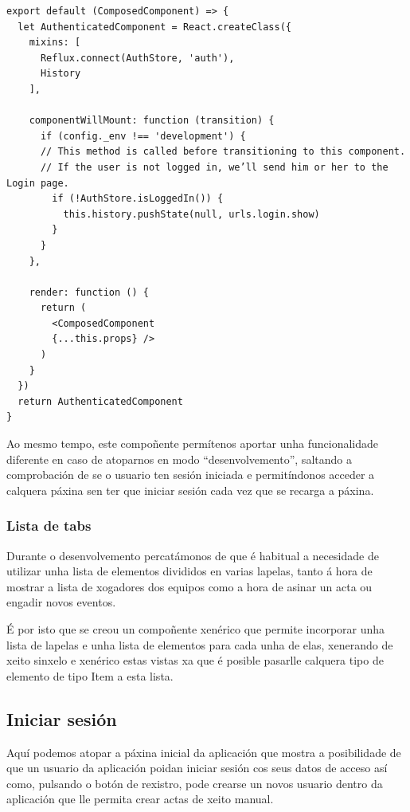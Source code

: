     \begin{lstlisting}[frame=single, caption=Compoñente de autenticación.]
export default (ComposedComponent) => {
  let AuthenticatedComponent = React.createClass({
    mixins: [
      Reflux.connect(AuthStore, 'auth'),
      History
    ],

    componentWillMount: function (transition) {
      if (config._env !== 'development') {
      // This method is called before transitioning to this component.
      // If the user is not logged in, we’ll send him or her to the Login page.
        if (!AuthStore.isLoggedIn()) {
          this.history.pushState(null, urls.login.show)
        }
      }
    },

    render: function () {
      return (
        <ComposedComponent
        {...this.props} />
      )
    }
  })
  return AuthenticatedComponent
}
    \end{lstlisting}

    Ao mesmo tempo, este compoñente permítenos aportar unha funcionalidade 
diferente en caso de atoparnos en modo ``desenvolvemento'', saltando a 
comprobación de se o usuario ten sesión iniciada e permitíndonos acceder a 
calquera páxina sen ter que iniciar sesión cada vez que se recarga a páxina.

      \subsubsection{Lista de tabs}
      Durante o desenvolvemento percatámonos de que é habitual a necesidade de 
utilizar unha lista de elementos divididos en varias lapelas, tanto á hora de 
mostrar a lista de xogadores dos equipos como a hora de asinar un acta ou 
engadir novos eventos.

      É por isto que se creou un compoñente xenérico que permite incorporar 
unha lista de lapelas e unha lista de elementos para cada unha de elas, 
xenerando de xeito sinxelo e xenérico estas vistas xa que é posible 
pasarlle calquera tipo de elemento de tipo Item a esta lista.

    \subsection{Iniciar sesión}
    Aquí podemos atopar a páxina inicial da aplicación que mostra a 
posibilidade de que un usuario da aplicación poidan iniciar sesión cos seus 
datos de acceso así como, pulsando o botón de rexistro, pode crearse un novos 
usuario dentro da aplicación que lle permita crear actas de xeito manual.

